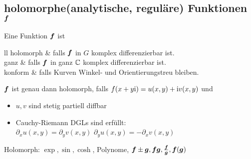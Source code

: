 \documentclass[german,color]{latex4ei/latex4ei_fs}
\begin{document}
\begin{sectionbox}
	\subsection{holomorphe(analytische, reguläre) Funktionen $\boldsymbol{f}$}
	Eine Funktion $\boldsymbol{f}$ ist \\ 
	\begin{tablebox}{ll}
		holomorph & falls $\boldsymbol{f}$ in $G$ komplex differenzierbar ist.\\
		ganz & falls $\boldsymbol{f}$ in ganz $\mathbb C$ komplex differenzierbar ist.\\
		konform & falls Kurven Winkel- und Orientierungstreu bleiben.\\

	\end{tablebox}
	$\boldsymbol{f}$ ist genau dann holomorph, falls $f(x+y\mathrm{i}) = u(x,y) + \mathrm{i} v(x,y)$ und
	\begin{itemize}\itemsep0pt
		\item $u,v$ sind stetig partiell diffbar
		\item Cauchy-Riemann DGLs sind erfüllt:\\
		$\partial_x u(x,y) = \partial_y v(x,y)$ \qquad $\partial_y u(x,y) = - \partial_x v(x,y)$\\
	\end{itemize}
	Holomorph: $\exp, \sin, \cosh$, Polynome, $\boldsymbol{f}\pm \boldsymbol{g}, \boldsymbol{f} \boldsymbol{g}, \frac{\boldsymbol{f}}{\boldsymbol{g}}, \boldsymbol{f}(\boldsymbol{g})$
\end{sectionbox}
\end{document}
